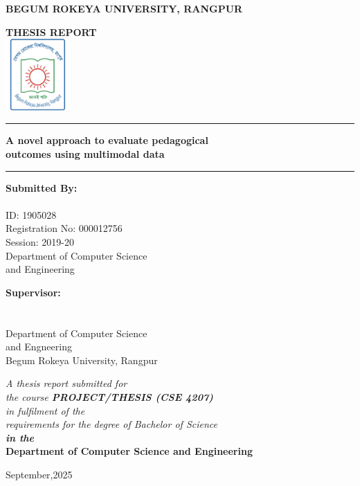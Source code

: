 \begin{titlepage}
\begin{center}
{\Large \textbf{BEGUM ROKEYA UNIVERSITY, RANGPUR}}

\vspace{1cm}
{ \textbf{THESIS REPORT}}\\
\vspace{0.5cm}
\includegraphics[width=2.5cm]{sections/logo.jpg}\\

\vspace{0.5cm}
\rule{\textwidth\color{pearsongray}}{0.4pt}

\vspace{0.2cm}
{\Large\textbf{A novel approach to evaluate pedagogical}}\\[0.1cm]
{\Large\textbf{outcomes using multimodal data}}
\vspace{0cm}

\rule{\textwidth\color{pearsongray}}{0.4pt}

\vspace{1.5cm}
\begin{minipage}[t]{0.45\textwidth}
\textbf{Submitted By:}\\
\theauthor\\
ID: 1905028\\
Registration No: 000012756\\
Session: 2019-20\\
Department of Computer Science \\and Engineering
\end{minipage}
\hfill
\begin{minipage}[t]{0.45\textwidth}
\textbf{Supervisor:}\\
\thesupervisor\\
\thesupervisortitle\\
Department of Computer Science\\ and Engneering\\
Begum Rokeya University, Rangpur
\end{minipage}

\vspace{1.5cm}
\textit{A thesis report submitted for\\
the course \textbf{PROJECT/THESIS (CSE 4207)}\\
in fulfilment of the\\
requirements for the degree of Bachelor of Science\\
\textbf{in the}}\\
\large \textbf{Department of Computer Science and Engineering}

\vspace{0.5cm}
\small September,2025
\end{center}
\end{titlepage}
